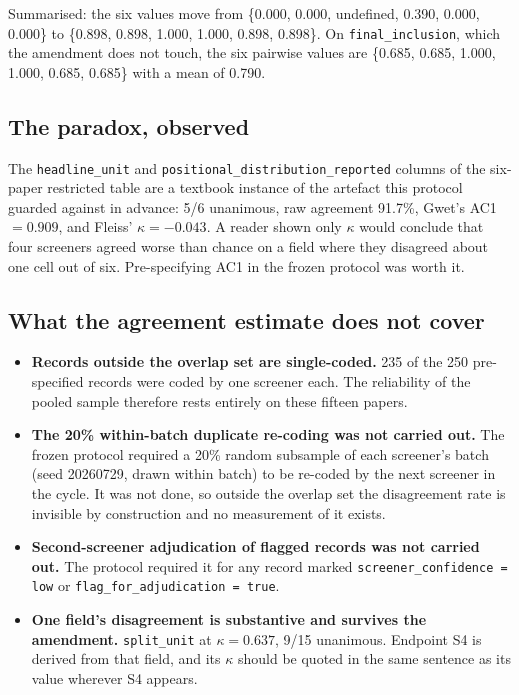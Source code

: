 \documentclass[11pt,a4paper]{article}
\begin{document}
\noindent Summarised: the six values move from
\{0.000, 0.000, undefined, 0.390, 0.000, 0.000\} to
\{0.898, 0.898, 1.000, 1.000, 0.898, 0.898\}. On
\texttt{final\_inclusion}, which the amendment does not touch, the six pairwise
values are \{0.685, 0.685, 1.000, 1.000, 0.685, 0.685\} with a mean of 0.790.

\subsection{The paradox, observed}

The \texttt{headline\_unit} and \texttt{positional\_distribution\_reported} columns of
the six-paper restricted table are a textbook instance of the artefact this protocol
guarded against in advance: 5/6 unanimous, raw agreement 91.7\%, Gwet's AC1 $=0.909$,
and Fleiss' $\kappa = -0.043$. A reader shown only $\kappa$ would conclude that four
screeners agreed worse than chance on a field where they disagreed about one cell out
of six. Pre-specifying AC1 in the frozen protocol was worth it.

\subsection{What the agreement estimate does not cover}

\begin{itemize}
\item \textbf{Records outside the overlap set are single-coded.} 235 of the 250
pre-specified records were coded by one screener each. The reliability of the pooled
sample therefore rests entirely on these fifteen papers.
\item \textbf{The 20\% within-batch duplicate re-coding was not carried out.} The
frozen protocol required a 20\% random subsample of each screener's batch (seed
20260729, drawn within batch) to be re-coded by the next screener in the cycle. It was
not done, so outside the overlap set the disagreement rate is invisible by
construction and no measurement of it exists.
\item \textbf{Second-screener adjudication of flagged records was not carried out.}
The protocol required it for any record marked \texttt{screener\_confidence = low} or
\texttt{flag\_for\_adjudication = true}.
\item \textbf{One field's disagreement is substantive and survives the amendment.}
\texttt{split\_unit} at $\kappa = 0.637$, 9/15 unanimous. Endpoint S4 is derived from
that field, and its $\kappa$ should be quoted in the same sentence as its value
wherever S4 appears.
\end{itemize}
\end{document}
